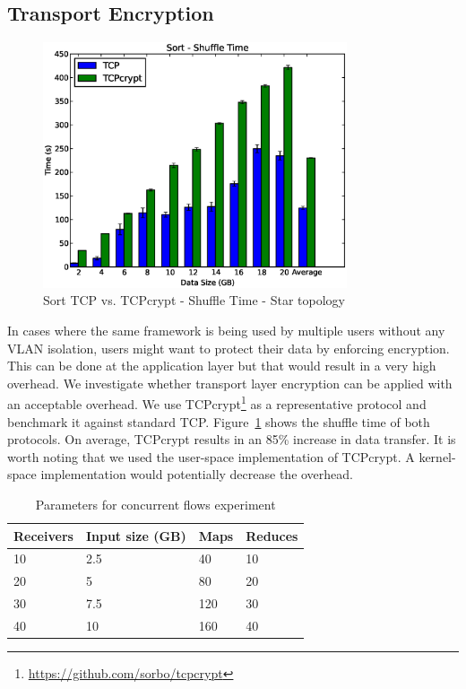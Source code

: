 \documentclass[a4paper,12pt,twoside,openright]{report}
\begin{document}
\subsection{Transport Encryption}
\begin{figure}[h!]
  \centering
    \includegraphics[width=0.8\textwidth]{shuffle_sort_tcpcrypt.eps}
    \caption{Sort TCP vs. TCPcrypt - Shuffle Time - Star topology}
    \label{chap:eval:sec:ciel:fig:sortshuffletcpcrypt}
\end{figure}
In cases where the same framework is being used by multiple users without any
VLAN isolation, users might want to protect their data by enforcing encryption.
This can be done at the application layer but that would result in a very high
overhead. We investigate whether transport layer encryption can be applied with
an acceptable overhead. We use
TCPcrypt\footnote{\url{https://github.com/sorbo/tcpcrypt}} as a representative
protocol and benchmark it against standard TCP.
Figure~\ref{chap:eval:sec:ciel:fig:sortshuffletcpcrypt} shows the shuffle time
of both protocols. On average, TCPcrypt results in an 85\% increase in data
transfer. It is worth noting that we used the user-space implementation of
TCPcrypt. A kernel-space implementation would potentially decrease the overhead.

\begin{table}
  \centering
  \begin{tabular}{| l || l | l | l |}
    \hline
	\textbf{Receivers} & \textbf{Input size (GB)} & \textbf{Maps} &
	\textbf{Reduces}
	\\
	\hline
	10 & 2.5 & 40 & 10 \\ \hline
    20 & 5 & 80 & 20 \\ \hline
    30 & 7.5 & 120 & 30 \\ \hline
    40 & 10 & 160 & 40\\ \hline
    \hline
  \end{tabular}
  \caption{Parameters for concurrent flows experiment}
  \label{chap:eval:sec:ciel:tab:flows}
\end{table}
\end{document}
